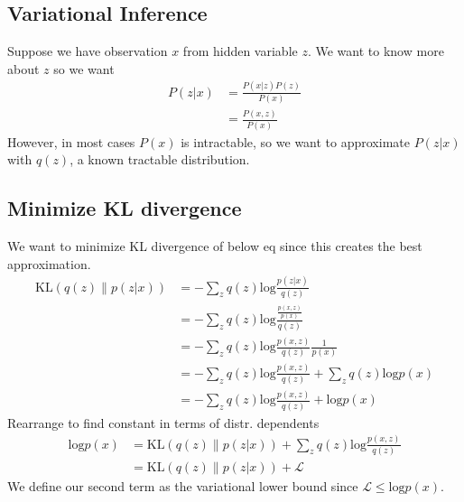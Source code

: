 \documentclass{article}
\begin{document}
\subsection{Variational Inference}
Suppose we have observation $x$ from hidden variable $z$. We want to know more about $z$ so we want \begin{equation*}\label{goal}
\begin{aligned}
    P(z|x) &= \frac{P(x|z)P(z)}{P(x)}\\
    &= \frac{P(x, z)}{P(x)}
\end{aligned}
\end{equation*}
However, in most cases $P(x)$ is intractable, so we want to approximate $P(z|x)$ with $q(z)$, a known tractable distribution.
\subsection{Minimize KL divergence}
We want to minimize KL divergence of below eq since this creates the best approximation.
\begin{equation*}\label{approx}
\begin{aligned}
    \text{KL}(q(z)\parallel p(z|x)) &= -\sum_z q(z)\text{log}\frac{p(z|x)}{q(z)}\\
    &= -\sum_z q(z) \text{log}\frac{\frac{p(x,z)}{p(x)}}{q(z)}\\
    &= - \sum_z q(z)\text{log}\frac{p(x,z)}{q(z)}\frac{1}{p(x)}\\
    &= - \sum_z q(z)\text{log}\frac{p(x,z)}{q(z)} + \sum_z q(z)\text{log}p(x)\\
    &= - \sum_z q(z)\text{log}\frac{p(x,z)}{q(z)} + \text{log}p(x)
\end{aligned}
\end{equation*}
Rearrange to find constant in terms of distr. dependents
\begin{equation*}\label{rearrange}
\begin{aligned}
    \text{log}p(x) &= \text{KL}(q(z)\parallel p(z|x)) + \sum_z q(z)\text{log}\frac{p(x,z)}{q(z)}\\
    &= \text{KL}(q(z)\parallel p(z|x)) +\mathcal{L}
\end{aligned}
\end{equation*}
We define our second term as the variational lower bound since $\mathcal{L}\leq \text{log}p(x)$.
\end{document}
